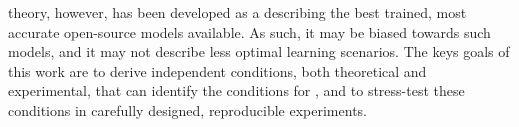 \HTSR theory, however, has been developed as a \Phenomenology describing the best trained, most accurate open-source models available.
As such, it may be biased towards such models, and it may not describe less optimal learning scenarios.
The keys goals of this work are to derive independent conditions, both theoretical and experimental, that can
identify the conditions for \IdealLearning, and to stress-test these conditions in carefully designed,
reproducible experiments.

